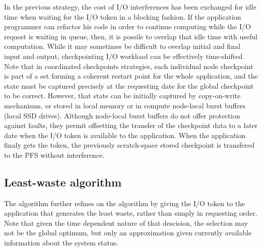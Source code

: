 In the previous strategy, the cost of I/O interferences has been
exchanged for idle time when waiting for the I/O token in a blocking
fashion. If the application programmer can refactor his code in order
to continue computing while the I/O request is waiting in queue,
then, it is possile to overlap that idle time with useful computation.
While it may sometimes be difficult to overlap initial and final input
and output, checkpointing I/O workload can be effectively time-shifted.
Note that in coordinated checkpoints strategies, each individual node
checkpoint is part of a set forming a coherent restart point for the
whole application, and the state must be captured precisely at the
requesting date for the global checkpoint to be correct. However, that
 state can be initially captured by copy-on-write mechanisms, or stored
in local memory or in compute node-local burst buffers (\eg local SSD
drives). Although node-local burst buffers do not offer protection
against faults, they permit offsetting the transfer of the checkpoint
data to a later date when the I/O token is available to the application.
When the application finaly gets the token, the previously scratch-space
stored checkpoint is transfered to the PFS without interference.


\subsection{Least-waste algorithm}

The \leastwaste algorithm further refines on the \fifononblock algorithm
by giving the I/O token to the application that generates the least
waste, rather than simply in requesting order. Note that given the time
dependent nature of that descision, the selection may
not be the global optimum, but only an approximation given currently
available information about the system status.





